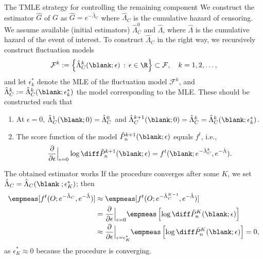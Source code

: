 \documentclass[smaller]{beamer}\usepackage{listings}
\begin{document}
\begin{frame}[label={sec:org7a9f23e}]{The TMLE strategy for controlling the remaining component}
We construct the estimator $\hat{G}$ of $G$ as $\hat{G} = e^{-\hat{\Lambda}_C}$ where
$\hat{\Lambda}_C$ is the cumulative hazard of censoring. \pause We assume available (initial
estimators) $\hat{\Lambda}_C^0$ and $\hat{\Lambda}$, where $\hat{\Lambda}$ is the cumulative
hazard of the event of interest. \pause To construct $\hat{\Lambda}_C$ in the right way, we
recursively construct fluctuation models
\begin{equation*}
  \mathcal{F}^{k}:=
  \left\{
    \hat{\Lambda}_C^{k}(\blank;\epsilon) \, : \, \epsilon \in \R
  \right\} \subset \mathcal{F}, \quad k = 1, 2, \dots, 
\end{equation*}
and let $\epsilon^*_k$ denote the MLE of the fluctuation model $\mathcal{F}^{k}$, and
$\hat{\Lambda}_C^k := \hat{\Lambda}_C^k(\blank; \epsilon^*_k)$ the model corresponding to the MLE. \pause
These should be constructed such that
\begin{enumerate}
\item \label{item:1} At $\epsilon = 0$, $\hat{\Lambda}_C^1(\blank; 0) = \hat{\Lambda}_C^0$ and
  $\hat{\Lambda}_C^{k+1}(\blank;0) = \hat{\Lambda}_C^{k} =
  \hat{\Lambda}_C^{k}(\blank;\epsilon^*_k)$. \pause
\item \label{item:2} The score function of the model
  $\hat{P}_n^{k+1}(\blank;\epsilon)$ equals $f^t$, i.e.,
  \begin{equation*}
    \frac{\partial }{\partial \epsilon} \Big\vert_{\epsilon=0} \log\diff\hat{P}_n^{k+1}(\blank;\epsilon) = f^t(\blank; e^{-\hat{\Lambda}_C^{k}}, e^{-\hat{\Lambda}}).
  \end{equation*}
\end{enumerate}
\end{frame}

\begin{frame}[label={sec:org0798422}]{The obtained estimator works}
If the procedure converges after some $K$, we set
$\hat{\Lambda}_C = \hat{\Lambda}_C(\blank \; ; \epsilon^*_K)$; then
\begin{align*}
  \empmeas[f^t(O; e^{-\hat{\Lambda}_C}, e^{-\hat{\Lambda}})]
  & \approx \empmeas[f^t(O; e^{-\hat{\Lambda}_C^{K-1}}, e^{-\hat{\Lambda}})]
  \\ &  = \frac{\partial }{\partial \epsilon} \Big\vert_{\epsilon=0}\empmeas
       \left[
       \log\diff\hat{P}_n^{K}(\blank;\epsilon)
       \right]
  \\ &
       \approx \frac{\partial }{\partial \epsilon} \Big\vert_{\epsilon=\epsilon^*_K}\empmeas
       \left[
       \log\diff\hat{P}_n^{K}(\blank;\epsilon)
       \right]
       = 0,
\end{align*}
as $\epsilon^*_K \approx 0$ because the procedure is converging. 
\end{frame}
\end{document}
